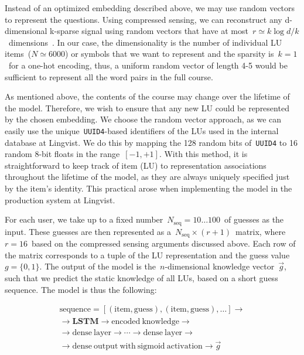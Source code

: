 Instead of an optimized embedding described above, we may use random vectors to represent the questions. Using compressed sensing, we can reconstruct any d-dimensional k-sparse signal using random vectors that have at most~$r \simeq k\log d/k$~dimensions~\cite{baraniuk2007compressive}. In our case, the dimensionality is the number of individual LU items~($N \simeq 6000$) or symbols that we want to represent and the sparsity is~$k=1$~for a one-hot encoding, thus, a uniform random vector of length 4-5 would be sufficient to represent all the word pairs in the full course.

As mentioned above, the contents of the course may change over the lifetime of the model. Therefore, we wish to ensure that any new LU could be represented by the chosen embedding. We choose the random vector approach, as we can easily use the unique~\texttt{UUID4}-based identifiers of the LUs used in the internal database at Lingvist. We do this by mapping the 128 random bits of~\texttt{UUID4} to 16 random 8-bit floats in the range~$[-1, +1]$. With this method, it is straightforward to keep track of item (LU) to representation associations throughout the lifetime of the model, as they are always uniquely specified just by the item's identity. This practical arose when implementing the model in the production system at Lingvist. 

For each user, we take up to a fixed number~$N_{\mathrm{seq}} = 10\dots100$~of guesses as the input. These guesses are then represented as a~$N_{\mathrm{seq}} \times (r + 1)$~matrix, where~$r=16$~based on the compressed sensing arguments discussed above. Each row of the matrix corresponds to a tuple of the LU representation and the guess value~$g=\{0,1\}$. The output of the model is the~$n$-dimensional knowledge vector~$\vec{g}$, such that we predict the static knowledge of all LUs, based on a short guess sequence. The model is thus the following:

\begin{gather*}
\mathrm{sequence} = [(\mathrm{item}, \mathrm{guess}), (\mathrm{item}, \mathrm{guess}), \dots] \rightarrow \\
\rightarrow \mathbf{LSTM} \rightarrow \mathrm{encoded\ knowledge} \rightarrow \\ \rightarrow \mathrm{dense~layer} \rightarrow \cdots \rightarrow \mathrm{dense~layer} \rightarrow \\
\rightarrow \mathrm{dense\ output\ with\ sigmoid\ activation} \rightarrow \vec{g} 
\end{gather*}

